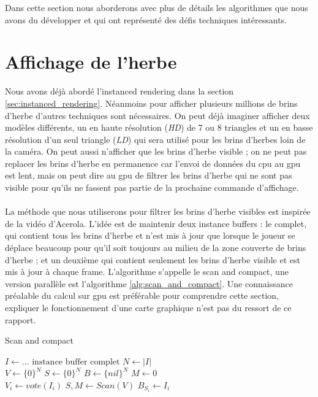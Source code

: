 \documentclass{EPUProjetDi}
\begin{document}
Dans cette section nous aborderons avec plus de détails les algorithmes que nous avons du développer et qui ont représenté des défis techniques intéressants.

\section{Affichage de l'herbe}
\label{section:grass_rendering}

Nous avons déjà abordé l'instanced rendering dans la section \ref{sec:instanced_rendering}. Néanmoins pour afficher plusieurs millions de brins d'herbe d'autres techniques sont nécessaires. On peut déjà imaginer afficher deux modèles différents, un en haute résolution (\textit{HD}) de 7 ou 8 triangles et un en basse résolution d'un seul triangle (\textit{LD}) qui sera utilisé pour les brins d'herbes loin de la caméra. On peut aussi n'afficher que les brins d'herbe visible ; on ne peut pas replacer les brins d'herbe en permanence car l'envoi de données du cpu au gpu est lent, mais on peut dire au gpu de filtrer les brins d'herbe qui ne sont pas visible pour qu'ils ne fassent pas partie de la prochaine commande d'affichage.

\paragraph{}
La méthode que nous utiliserons pour filtrer les brins d'herbe visibles est inspirée de la vidéo d'Acerola\cite{grass_rendering}. L'idée est de maintenir deux instance buffers : le complet, qui contient tous les brins d'herbe et n'est mis à jour que lorsque le joueur se déplace beaucoup pour qu'il soit toujours au milieu de la zone couverte de brins d'herbe ; et un deuxième qui contient seulement les brins d'herbe visible et est mis à jour à chaque frame. L'algorithme s'appelle le scan and compact, une version parallèle est l'algorithme \ref{alg:scan_and_compact}. Une connaissance préalable du calcul sur gpu est préférable pour comprendre cette section, expliquer le fonctionnement d'une carte graphique n'est pas du ressort de ce rapport.

\begin{algorithm}
\caption{Scan and compact}\label{alg:scan_and_compact}
\begin{algorithmic}
\State $I \gets \text{... instance buffer complet}$
\State $N \gets |I|$
\\
\State $V \gets \{0\}^N$ 
\State $S \gets \{0\}^N$ 
\State $B \gets \{nil\}^N$ 
\State $M \gets 0$ 
\\
	\State $V_i \gets vote(I_i)$ 
\EndParFor
\State $S,M\gets Scan(V)$
		\State $B_{S_i}\gets I_i$
	\EndIf
\EndParFor
\end{algorithmic}
\end{algorithm}
\end{document}
